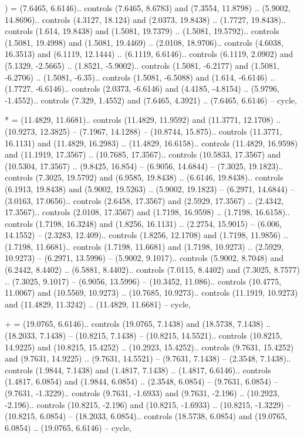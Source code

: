 ) = {(7.6465, 6.6146).. controls (7.6465, 8.6783) and (7.3554, 11.8798) .. (5.9002, 14.8696).. controls (4.3127, 18.124) and (2.0373, 19.8438) .. (1.7727, 19.8438).. controls (1.614, 19.8438) and (1.5081, 19.7379) .. (1.5081, 19.5792).. controls (1.5081, 19.4998) and (1.5081, 19.4469) .. (2.0108, 18.9706).. controls (4.6038, 16.3513) and (6.1119, 12.1444) .. (6.1119, 6.6146).. controls (6.1119, 2.0902) and (5.1329, -2.5665) .. (1.8521, -5.9002).. controls (1.5081, -6.2177) and (1.5081, -6.2706) .. (1.5081, -6.35).. controls (1.5081, -6.5088) and (1.614, -6.6146) .. (1.7727, -6.6146).. controls (2.0373, -6.6146) and (4.4185, -4.8154) .. (5.9796, -1.4552).. controls (7.329, 1.4552) and (7.6465, 4.3921) .. (7.6465, 6.6146) -- cycle},

* = {(11.4829, 11.6681).. controls (11.4829, 11.9592) and (11.3771, 12.1708) .. (10.9273, 12.3825) -- (7.1967, 14.1288) -- (10.8744, 15.875).. controls (11.3771, 16.1131) and (11.4829, 16.2983) .. (11.4829, 16.6158).. controls (11.4829, 16.9598) and (11.1919, 17.3567) .. (10.7685, 17.3567).. controls (10.5833, 17.3567) and (10.5304, 17.3567) .. (9.8425, 16.854) -- (6.9056, 14.6844) -- (7.3025, 19.1823).. controls (7.3025, 19.5792) and (6.9585, 19.8438) .. (6.6146, 19.8438).. controls (6.1913, 19.8438) and (5.9002, 19.5263) .. (5.9002, 19.1823) -- (6.2971, 14.6844) -- (3.0163, 17.0656).. controls (2.6458, 17.3567) and (2.5929, 17.3567) .. (2.4342, 17.3567).. controls (2.0108, 17.3567) and (1.7198, 16.9598) .. (1.7198, 16.6158).. controls (1.7198, 16.3248) and (1.8256, 16.1131) .. (2.2754, 15.9015) -- (6.006, 14.1552) -- (2.3283, 12.409).. controls (1.8256, 12.1708) and (1.7198, 11.9856) .. (1.7198, 11.6681).. controls (1.7198, 11.6681) and (1.7198, 10.9273) .. (2.5929, 10.9273) -- (6.2971, 13.5996) -- (5.9002, 9.1017).. controls (5.9002, 8.7048) and (6.2442, 8.4402) .. (6.5881, 8.4402).. controls (7.0115, 8.4402) and (7.3025, 8.7577) .. (7.3025, 9.1017) -- (6.9056, 13.5996) -- (10.3452, 11.086).. controls (10.4775, 11.0067) and (10.5569, 10.9273) .. (10.7685, 10.9273).. controls (11.1919, 10.9273) and (11.4829, 11.3242) .. (11.4829, 11.6681) -- cycle},

+ = {(19.0765, 6.6146).. controls (19.0765, 7.1438) and (18.5738, 7.1438) .. (18.2033, 7.1438) -- (10.8215, 7.1438) -- (10.8215, 14.5521).. controls (10.8215, 14.9225) and (10.8215, 15.4252) .. (10.2923, 15.4252).. controls (9.7631, 15.4252) and (9.7631, 14.9225) .. (9.7631, 14.5521) -- (9.7631, 7.1438) -- (2.3548, 7.1438).. controls (1.9844, 7.1438) and (1.4817, 7.1438) .. (1.4817, 6.6146).. controls (1.4817, 6.0854) and (1.9844, 6.0854) .. (2.3548, 6.0854) -- (9.7631, 6.0854) -- (9.7631, -1.3229).. controls (9.7631, -1.6933) and (9.7631, -2.196) .. (10.2923, -2.196).. controls (10.8215, -2.196) and (10.8215, -1.6933) .. (10.8215, -1.3229) -- (10.8215, 6.0854) -- (18.2033, 6.0854).. controls (18.5738, 6.0854) and (19.0765, 6.0854) .. (19.0765, 6.6146) -- cycle},

